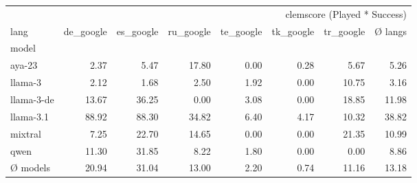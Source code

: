 \begin{tabular}{lrrrrrrr}
\toprule
 & \multicolumn{7}{r}{clemscore (Played * Success)} \\
lang & de_google & es_google & ru_google & te_google & tk_google & tr_google & Ø langs \\
model &  &  &  &  &  &  &  \\
\midrule
aya-23 & 2.37 & 5.47 & 17.80 & 0.00 & 0.28 & 5.67 & 5.26 \\
llama-3 & 2.12 & 1.68 & 2.50 & 1.92 & 0.00 & 10.75 & 3.16 \\
llama-3-de & 13.67 & 36.25 & 0.00 & 3.08 & 0.00 & 18.85 & 11.98 \\
llama-3.1 & 88.92 & 88.30 & 34.82 & 6.40 & 4.17 & 10.32 & 38.82 \\
mixtral & 7.25 & 22.70 & 14.65 & 0.00 & 0.00 & 21.35 & 10.99 \\
qwen & 11.30 & 31.85 & 8.22 & 1.80 & 0.00 & 0.00 & 8.86 \\
Ø models & 20.94 & 31.04 & 13.00 & 2.20 & 0.74 & 11.16 & 13.18 \\
\bottomrule
\end{tabular}
